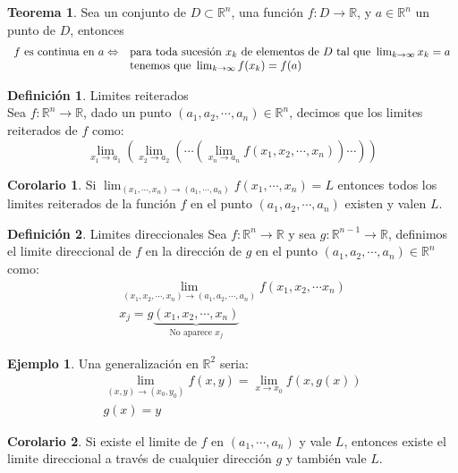 \documentclass[10pt]{article}
\theoremstyle{definition}
\newtheorem{definition}{Definición}[section]
\newtheorem{theorem}{Teorema}[section]
\newtheorem{corollary}{Corolario}[theorem]
\newtheorem{example}{Ejemplo}[section]
\begin{document}
\begin{theorem}
    Sea un conjunto de $D\subset\mathbb{R}^n$, una función $f:D\to\mathbb{R}$, y $a\in\mathbb{R}^n$ un punto de $D$, entonces $$\begin{array}{ c l }
f\ \text{es continua en } a\Leftrightarrow  & \text{para toda sucesión } x_{k} \ \text{de elementos de } D\ \text{tal que }\lim _{k\rightarrow \infty } x_{k} =a\\
 & \text{tenemos que }\lim _{k\rightarrow \infty } f( x_{k}) =f( a)
\end{array}$$
\end{theorem}
\begin{definition}{Limites reiterados}
    \\Sea $f:\mathbb{R}^n\to\mathbb{R}$, dado un punto $(a_1,a_2,\cdots,a_n)\in\mathbb{R}^n$, decimos que los limites reiterados de $f$ como:$$\lim_{x_1 \to a_1}\left( \lim_{x_2 \to a_2}\left(\cdots\left( \lim_{x_n \to a_n} f(x_1,x_2,\cdots,x_n)\right)\cdots \right) \right) $$
\end{definition}
\begin{corollary}
    Si $\lim_{(x_1,\cdots,x_n) \to (a_1,\cdots,a_n)}f(x_1,\cdots,x_n)=L$ entonces todos los limites reiterados de la función $f$ en el punto $(a_1,a_2,\cdots,a_n)$ existen y valen $L$.
\end{corollary}
\begin{definition}{Limites direccionales}
    Sea $f:\mathbb{R}^n\to\mathbb{R}$ y sea $g:\mathbb{R}^{n-1}\to\mathbb{R}$, definimos el limite direccional de $f$ en la dirección de $g$ en el punto $(a_1,a_2,\cdots,a_n)\in\mathbb{R}^n$ como:$$\begin{array}{ l }
\lim _{( x_{1} ,x_{2} ,\cdots ,x_{n})\rightarrow ( a_{1} ,a_{2} ,\cdots ,a_{n})} f( x_{1} ,x_{2} ,\cdots x_{n})\\
x_{j} =g\underbrace{( x_{1} ,x_{2} ,\cdots ,x_{n})}_{\text{No aparece } x_{j}}
\end{array}$$
\end{definition}
\begin{example}
    Una generalización en $\mathbb{R}^2$ seria: $$\begin{array}{ c }
\lim _{( x,y)\rightarrow ( x_{0} ,y_{0})} f( x,y) =\lim _{x\rightarrow x_{0}} f( x,g( x))\\
g( x) =y
\end{array}$$
\end{example}
\begin{corollary}
    Si existe el limite de $f$ en $(a_1,\cdots,a_n)$ y vale $L$, entonces existe el limite direccional a través de cualquier dirección $g$ y también vale $L$.
\end{corollary}
\end{document}
